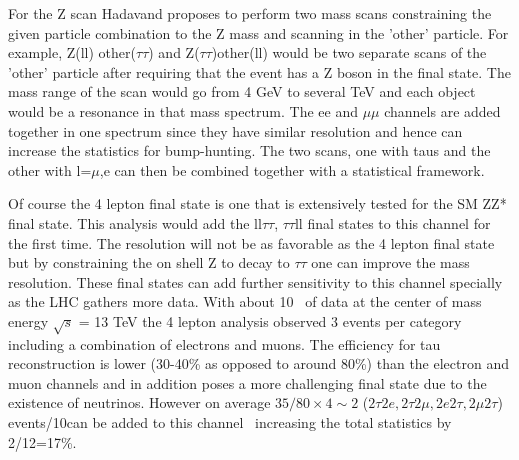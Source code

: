 For the Z scan Hadavand proposes to perform two mass scans constraining the given particle combination to the Z mass and scanning in the 'other' particle. 
For example, Z(ll) other($\tau\tau$) and Z($\tau\tau$)other(ll) would be two separate scans of the 'other' particle after requiring that the event has a Z boson in the final state. 
The mass range of the scan would go from 4 GeV to several TeV and each object would be a resonance in that mass spectrum. The ee and $\mu\mu$ channels are added together 
in one spectrum since they have similar resolution and hence can increase the statistics for bump-hunting.  
The two scans, one with taus and the other with l=$\mu$,e  can then be combined together with a statistical framework.  

Of course the 4 lepton final state is one that is extensively tested for the SM ZZ* final state. This analysis would add the ll$\tau\tau$, $\tau\tau$ll final states to this channel for the first time.  The resolution will not be as favorable as
the 4 lepton final state but by constraining the on shell Z to decay to $\tau \tau$ one can improve the mass resolution.  These final states can add further sensitivity to this channel specially as the LHC
gathers more data.  With about 10 \invfb\ of data at the center of mass energy $\sqrt s$ = 13 TeV the 4 lepton analysis observed 3 events per category including a combination of electrons and muons.  The efficiency for tau reconstruction is lower (30-40\% as opposed to around 80\%) than the electron and muon channels and in 
addition poses a more challenging final state due to the existence of neutrinos.
However on average $35/80\times4\sim 2$ ($2\tau2e, 2\tau2\mu, 2e2\tau,2\mu2\tau$) events/10\invfb can be added to this channel~\cite{2016:4l} increasing the total statistics by 2/12=17\%. 

